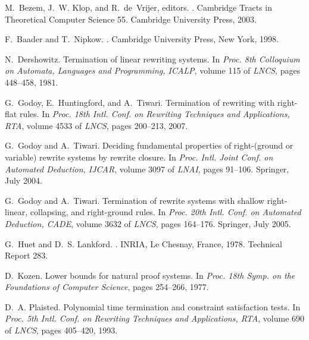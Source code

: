 \documentclass{LMCS}
\theoremstyle{plain}
\begin{document}
\begin{thebibliography}{BKdV03}

M.~Bezem, J.~W. Klop, and R.~de~Vrijer, editors.
.
\newblock Cambridge Tracts in Theoretical Computer Science 55. Cambridge
  University Press, 2003.

F.~Baader and T.~Nipkow.
.
\newblock Cambridge University Press, New York, 1998.

N.~Dershowitz.
\newblock Termination of linear rewriting systems.
\newblock In {\em Proc. 8th Colloquium on Automata, Languages and Programming,
  ICALP}, volume 115 of {\em LNCS}, pages 448--458, 1981.

G.~Godoy, E.~Huntingford, and A.~Tiwari.
\newblock Termination of rewriting with right-flat rules.
\newblock In {\em Proc. 18th Intl. Conf. on Rewriting Techniques and
  Applications, RTA}, volume 4533 of {\em LNCS}, pages 200--213, 2007.

G.~Godoy and A.~Tiwari.
\newblock Deciding fundamental properties of right-(ground or variable) rewrite
  systems by rewrite closure.
\newblock In {\em Proc. Intl. Joint Conf. on Automated Deduction, IJCAR},
  volume 3097 of {\em LNAI}, pages 91--106. Springer, July 2004.

G.~Godoy and A.~Tiwari.
\newblock Termination of rewrite systems with shallow right-linear, collapsing,
  and right-ground rules.
\newblock In {\em Proc. 20th Intl. Conf. on Automated Deduction, CADE}, volume
  3632 of {\em LNCS}, pages 164--176. Springer, July 2005.

G.~Huet and D.~S. Lankford.
.
\newblock INRIA, Le Chesnay, France, 1978.
\newblock Technical Report 283.

D.~Kozen.
\newblock Lower bounds for natural proof systems.
\newblock In {\em Proc. 18th Symp. on the Foundations of Computer Science},
  pages 254--266, 1977.

D.~A. Plaisted.
\newblock Polynomial time termination and constraint satisfaction tests.
\newblock In {\em Proc. 5th Intl. Conf. on Rewriting Techniques and
  Applications, RTA}, volume 690 of {\em LNCS}, pages 405--420, 1993.


\end{thebibliography}
\end{document}
